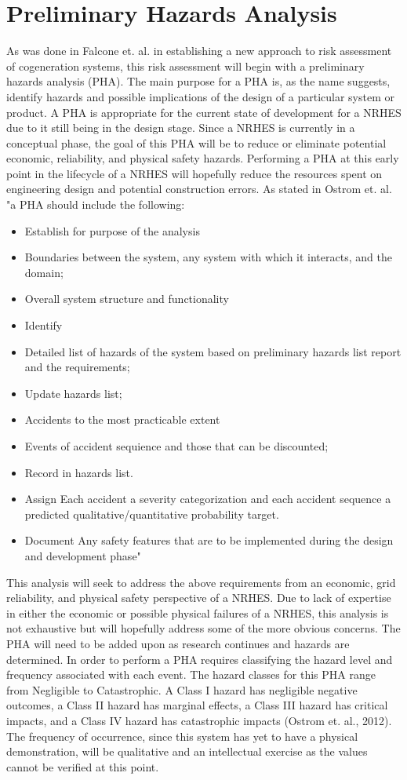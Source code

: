 \documentclass[12pt]{UIdahoMastersThesis}
\begin{document}
\section{Preliminary Hazards Analysis}
As was done in Falcone et. al. in establishing a new approach to risk assessment of cogeneration systems, this risk assessment will begin with a preliminary hazards analysis (PHA). The main purpose for a PHA is, as the name suggests, identify hazards and possible implications of the design of a particular system or product.  A PHA is appropriate for the current state of development for a NRHES due to it still being in the design stage. Since a NRHES is currently in a conceptual phase, the goal of this PHA will be to reduce or eliminate potential economic, reliability, and physical safety hazards. Performing a PHA at this early point in the lifecycle of a NRHES will hopefully reduce the resources spent on engineering design and potential construction errors. As stated in Ostrom et. al.  "a PHA should include the following:

\begin{itemize}
\item Establish for purpose of the analysis
\item Boundaries between the system, any system with which it interacts, and the domain;
\item Overall system structure and functionality
\item Identify
\item Detailed list of hazards of the system based on preliminary hazards list report and the requirements;
\item Update hazards list;
\item Accidents to the most practicable extent
\item Events of accident sequience and those that can be discounted;
\item Record in hazards list.
\item Assign Each accident a severity categorization and each accident sequence a predicted qualitative/quantitative probability target.
\item Document Any safety features that are to be implemented during the design and development phase"
\end{itemize}
This analysis will seek to address the above requirements from an economic, grid reliability, and physical safety perspective of a NRHES. Due to lack of expertise in either the economic or possible physical failures of a NRHES, this analysis is not exhaustive but will hopefully address some of the more obvious concerns. The PHA will need to be added upon as research continues and hazards are determined. 
	In order to perform a PHA requires classifying the hazard level and frequency associated with each event. The hazard classes for this PHA range from Negligible to Catastrophic. A Class I hazard has negligible negative outcomes, a Class II hazard has marginal effects, a Class III hazard has critical impacts, and a Class IV hazard has catastrophic impacts (Ostrom et. al., 2012).  The frequency of occurrence, since this system has yet to have a physical demonstration, will be qualitative and an intellectual exercise as the values cannot be verified at this point. 
\end{document}
